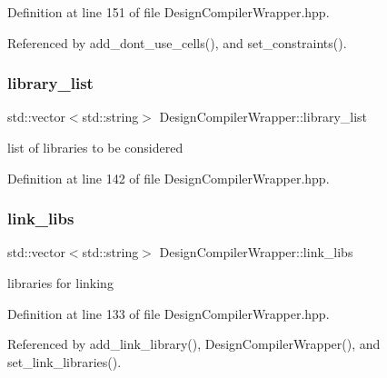 Definition at line 151 of file Design\+Compiler\+Wrapper.\+hpp.



Referenced by add\+\_\+dont\+\_\+use\+\_\+cells(), and set\+\_\+constraints().

\mbox{\label{classDesignCompilerWrapper_a329b4cc4b4110435c908e7bf30460a70}} 
\subsubsection{\texorpdfstring{library\+\_\+list}{library\_list}}
{\footnotesize\ttfamily std\+::vector$<$std\+::string$>$ Design\+Compiler\+Wrapper\+::library\+\_\+list\hspace{0.3cm}{\ttfamily [protected]}}



list of libraries to be considered 



Definition at line 142 of file Design\+Compiler\+Wrapper.\+hpp.

\mbox{\label{classDesignCompilerWrapper_a33785337e63af7a30d751a058f733fa7}} 
\subsubsection{\texorpdfstring{link\+\_\+libs}{link\_libs}}
{\footnotesize\ttfamily std\+::vector$<$std\+::string$>$ Design\+Compiler\+Wrapper\+::link\+\_\+libs\hspace{0.3cm}{\ttfamily [protected]}}



libraries for linking 



Definition at line 133 of file Design\+Compiler\+Wrapper.\+hpp.



Referenced by add\+\_\+link\+\_\+library(), Design\+Compiler\+Wrapper(), and set\+\_\+link\+\_\+libraries().

\mbox{\label{classDesignCompilerWrapper_a7d3de54f0ae14f2791c4bf46fcd58c2e}} 
